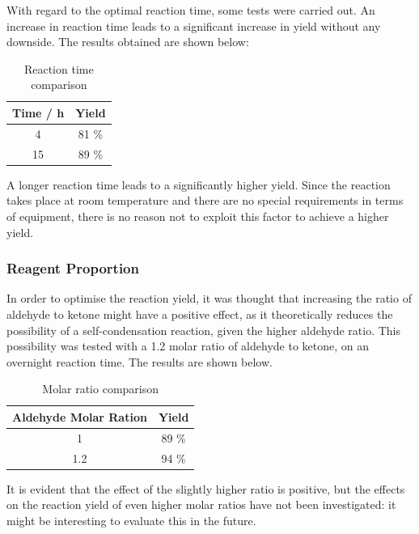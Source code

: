 \documentclass[../Master.tex]{subfiles}
\begin{document}
With regard to the optimal reaction time, some tests were carried out. An increase in reaction time leads to a significant increase in yield without any downside. The results obtained are shown below:


\begin{table}[h!]
	\centering
	\begin{tabular}[b]{cc}
		\toprule
		Time / h & Yield \\
		\midrule
		4        & 81 \% \\
		15       & 89 \% \\
		\bottomrule
	\end{tabular}
	\caption{Reaction time comparison}\label{tab:hydrazine-ratio}
\end{table}

A longer reaction time leads to a significantly higher yield. Since the reaction takes place at room temperature and there are no special requirements in terms of equipment, there is no reason not to exploit this factor to achieve a higher yield.

\subsubsection{Reagent Proportion}

In order to optimise the reaction yield, it was thought that increasing the ratio of aldehyde to ketone might have a positive effect, as it theoretically reduces the possibility of a self-condensation reaction, given the higher aldehyde ratio.
This possibility was tested with a 1.2 molar ratio of aldehyde to ketone, on an overnight reaction time. The results are shown below.

\begin{table}[h!]
	\centering
	\begin{tabular}[b]{cc}
		\toprule
		Aldehyde Molar Ration & Yield \\
		\midrule
		1                     & 89 \% \\
		1.2                   & 94 \% \\
		\bottomrule
	\end{tabular}
	\caption{Molar ratio comparison}\label{tab:hydrazine-ratio}
\end{table}

It is evident that the effect of the slightly higher ratio is positive, but the effects on the reaction yield of even higher molar ratios have not been investigated: it might be interesting to evaluate this in the future.
\end{document}
